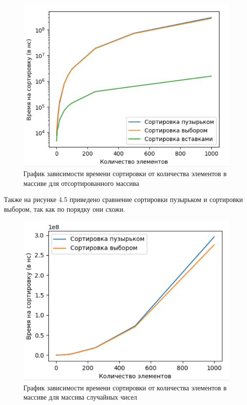 \FloatBarrier
\begin{figure}[h]
	\begin{center}
		\includegraphics{inc/random3.png}
	\end{center}
	\caption{График зависимости времени сортировки от количества элементов в массиве для отсортированного массива}
\end{figure}
\FloatBarrier

Также на рисунке 4.5 приведено сравнение сортировки пузырьком и сортировки выбором, так как 
по порядку они схожи.

\FloatBarrier
\begin{figure}[h]
	\begin{center}
		\includegraphics{inc/random4.png}
	\end{center}
	\caption{График зависимости времени сортировки от количества элементов в массиве для массива случайных чисел}
\end{figure}
\FloatBarrier

